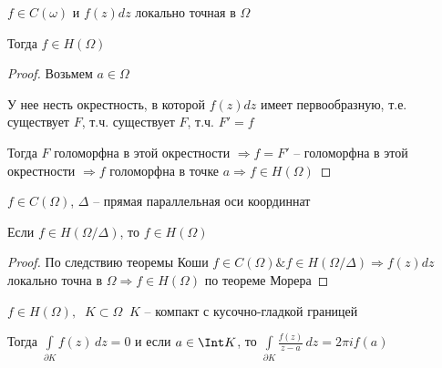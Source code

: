 
\begin{theorem}[Мореры]\thmslashn
	
	$f\in C(\omega)$ и $f(z)dz$ локально точная в $\Omega$
	
	Тогда $f \in H(\Omega)$ 
	
\end{theorem}

\begin{proof}\thmslashn
	
	Возьмем $a\in \Omega$
	
	У нее несть окрестность, в которой $f(z)dz$ имеет первообразную, т.е. существует $F$, т.ч. существует $F$, т.ч. $F' = f$
	
	Тогда $F$ голоморфна в этой окрестности $\Rightarrow f = F'$ -- голоморфна в этой окрестности $\Rightarrow f$ голоморфна в точке $a \Rightarrow f \in H(\Omega)$    
	
\end{proof}

\begin{consequence}\thmslashn
	
	$f \in C(\Omega)$, $\Delta$ -- прямая параллельная оси координнат 
	
	Если $f \in H(\Omega /\Delta)$, то $f \in H(\Omega)$
	
\end{consequence}

\begin{proof}\thmslashn
	
	По следствию теоремы Коши $f\in C(\Omega) \& f\in H(\Omega /\Delta) \Rightarrow f(z)dz$ локально точна в $\Omega \Rightarrow f \in H(\Omega)$ по теореме Морера
		
\end{proof}

\begin{theorem}

	$f\in H(\Omega), \;\; K\subset \Omega\;\; K$ -- компакт с кусочно-гладкой границей
	
	Тогда $\int\limits_{\partial K} f(z)\,dz = 0$ и если $a \in \Int K$, то $\int\limits_{\partial K} \frac{f(z)}{z-a}\,dz = 2\pi i f(a)$

\end{theorem}


